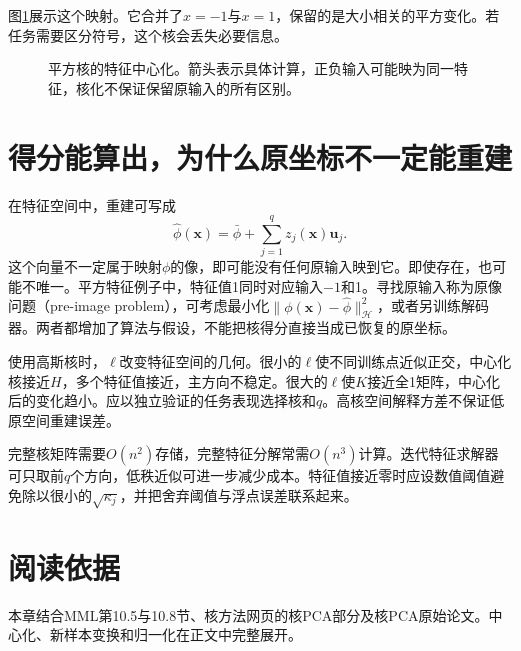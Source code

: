 图\ref{fig:kpca-square-map}展示这个映射。它合并了$x=-1$与$x=1$，保留的是大小相关的平方变化。若任务需要区分符号，这个核会丢失必要信息。
\begin{figure}[htbp]
\centering
{}
\caption{平方核的特征中心化。箭头表示具体计算，正负输入可能映为同一特征，核化不保证保留原输入的所有区别。}
\label{fig:kpca-square-map}
\end{figure}

\section{得分能算出，为什么原坐标不一定能重建}
在特征空间中，重建可写成
\begin{equation}
 \hat\phi(\bm x)=\bar\phi+\sum_{j=1}^qz_j(\bm x)\bm u_j.
\end{equation}
这个向量不一定属于映射$\phi$的像，即可能没有任何原输入映到它。即使存在，也可能不唯一。平方特征例子中，特征值1同时对应输入$-1$和1。寻找原输入称为原像问题（pre-image problem），可考虑最小化$\|\phi(\bm x)-\hat\phi\|_{\mathcal H}^2$，或者另训练解码器。两者都增加了算法与假设，不能把核得分直接当成已恢复的原坐标。

使用高斯核时，$\ell$改变特征空间的几何。很小的$\ell$使不同训练点近似正交，中心化核接近$H$，多个特征值接近，主方向不稳定。很大的$\ell$使$K$接近全1矩阵，中心化后的变化趋小。应以独立验证的任务表现选择核和$q$。高核空间解释方差不保证低原空间重建误差。

完整核矩阵需要$O(n^2)$存储，完整特征分解常需$O(n^3)$计算。迭代特征求解器可只取前$q$个方向，低秩近似可进一步减少成本。特征值接近零时应设数值阈值避免除以很小的$\sqrt{\kappa_j}$，并把舍弃阈值与浮点误差联系起来。

\section{阅读依据}
本章结合MML第10.5与10.8节、核方法网页的核PCA部分及核PCA原始论文\cite{scholkopf1998kpca}。中心化、新样本变换和归一化在正文中完整展开。
